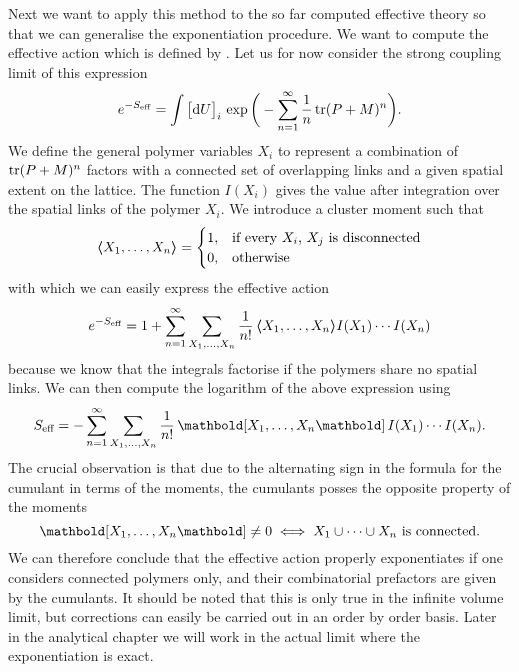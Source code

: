 Next we want to apply this method to the so far computed effective theory so
that we can generalise the exponentiation procedure. We want to compute the
effective action which is defined by . Let us for now
consider the strong coupling limit of this expression
%
\begin{equation}
  e^{-S_{\text{eff}}} = \int \big[ \mathrm{d} U \big]_i \,
    \exp \bigg(- \sum_{n=1}^{\infty} \frac{1}{n} \tr (P + M)^n \bigg).
\end{equation}
%
We define the general polymer variables $X_i$ to represent a combination of $\tr
(P + M)^n$ factors with a connected set of overlapping links and a given spatial
extent on the lattice. The function $I(X_i)$ gives the value after integration
over the spatial links of the polymer $X_i$. We introduce a cluster moment such
that
%
\begin{equation}
  \moment[X_1, \dots, X_n] =
  \begin{cases}
    1, & \text{if every $X_i$, $X_j$ is disconnected} \\
    0, & \text{otherwise}
  \end{cases}
\end{equation}
%
with which we can easily express the effective action
%
\begin{equation}
  e^{-S_{\text{eff}}} = 1 + \sum_{n=1}^{\infty} \sum_{X_1, \dots, X_n} \frac{1}{n!}\,
    \moment[X_1, \dots, X_n] I(X_1) \cdots I(X_n)
\end{equation}
%
because we know that the integrals factorise if the polymers share no spatial
links. We can then compute the logarithm of the above expression using
%
\begin{equation}
  S_{\text{eff}} = -\sum_{n=1}^{\infty} \sum_{X_1,\dots,X_n} \frac{1}{n!}\,
    \cumulant[X_1,\dots,X_n]\, I(X_1) \cdots I(X_n).
\end{equation}
%
The crucial observation is that due to the alternating sign in the formula for
the cumulant in terms of the moments, the cumulants posses the opposite property
of the moments
%
\begin{equation}
  \cumulant[X_1,\dots,X_n] \neq 0 \iff X_1 \cup \dots \cup X_n \text{ is connected}.
\end{equation}
%
We can therefore conclude that the effective action properly exponentiates if
one considers connected polymers only, and their combinatorial prefactors are
given by the cumulants. It should be noted that this is only true in the
infinite volume limit, but corrections can easily be carried out in an order by
order basis. Later in the analytical chapter we will work in the actual limit
where the exponentiation is exact.

